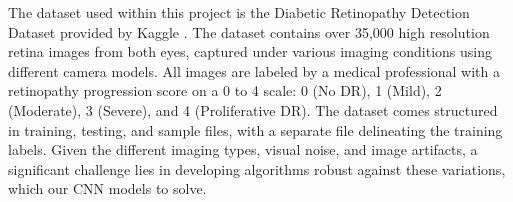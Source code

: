 The dataset used within this project is the Diabetic Retinopathy Detection Dataset provided by Kaggle \cite{noauthor_diabetic_nodate}. The dataset contains over 35,000 high resolution retina images from both eyes, captured under various imaging conditions using different camera models. All images are labeled by a medical professional with a retinopathy progression score on a 0 to 4 scale: 0 (No DR), 1 (Mild), 2 (Moderate), 3 (Severe), and 4 (Proliferative DR). The dataset comes structured in training, testing, and sample files, with a separate file delineating the training labels. Given the different imaging types, visual noise, and image artifacts, a significant challenge lies in developing algorithms robust against these variations, which our CNN models to solve.